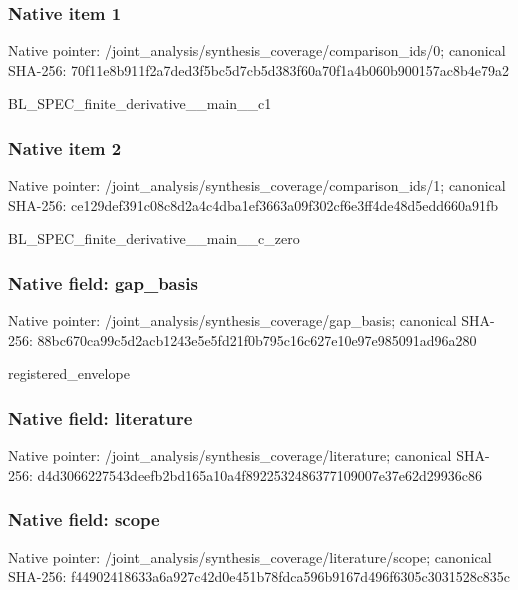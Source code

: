 \documentclass[10pt,a4paper]{article}
\begin{document}
\subsubsection{Native item 1}
Native pointer: /joint\_\allowbreak{}analysis/synthesis\_\allowbreak{}coverage/comparison\_\allowbreak{}ids/0; canonical SHA-256: 70f11e8b911f2a7ded3f5bc5d7cb5d383f60a70f1a4b060b900157ac8b4e79a2

\begingroup\raggedright\sloppy BL\_\allowbreak{}SPEC\_\allowbreak{}finite\_\allowbreak{}derivative\_\allowbreak{}\_\allowbreak{}main\_\allowbreak{}\_\allowbreak{}c1\par\endgroup

\subsubsection{Native item 2}
Native pointer: /joint\_\allowbreak{}analysis/synthesis\_\allowbreak{}coverage/comparison\_\allowbreak{}ids/1; canonical SHA-256: ce129def391c08c8d2a4c4dba1ef3663a09f302cf6e3ff4de48d5edd660a91fb

\begingroup\raggedright\sloppy BL\_\allowbreak{}SPEC\_\allowbreak{}finite\_\allowbreak{}derivative\_\allowbreak{}\_\allowbreak{}main\_\allowbreak{}\_\allowbreak{}c\_\allowbreak{}zero\par\endgroup

\subsubsection{Native field: gap\_\allowbreak{}basis}
Native pointer: /joint\_\allowbreak{}analysis/synthesis\_\allowbreak{}coverage/gap\_\allowbreak{}basis; canonical SHA-256: 88bc670ca99c5d2acb1243e5e5fd21f0b795c16c627e10e97e985091ad96a280

\begingroup\raggedright\sloppy registered\_\allowbreak{}envelope\par\endgroup

\subsubsection{Native field: literature}
Native pointer: /joint\_\allowbreak{}analysis/synthesis\_\allowbreak{}coverage/literature; canonical SHA-256: d4d3066227543deefb2bd165a10a4f8922532486377109007e37e62d29936c86

\subsubsection{Native field: scope}
Native pointer: /joint\_\allowbreak{}analysis/synthesis\_\allowbreak{}coverage/literature/scope; canonical SHA-256: f44902418633a6a927c42d0e451b78fdca596b9167d496f6305c3031528c835c
\end{document}
